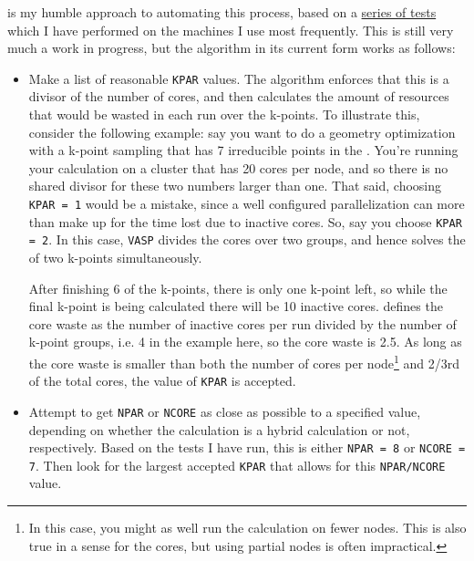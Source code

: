 \begin{refsection}
 is my humble approach to automating this 
process, based on a 
\href{https://mybinder.org/v2/gh/mbercx/jupyter/master?filepath=parallel\%2Fparallel_analysis.ipynb}{series 
of tests} which I have performed on the machines I use most frequently. This 
is still very much a work in progress, but the algorithm in its current form 
works as follows: 
 
\begin{itemize} 
 
\item Make a list of reasonable \texttt{KPAR} values. The algorithm enforces 
that this is a divisor of the number of cores, and then calculates the amount 
of resources that would be wasted in each run over the k-points. To illustrate 
this, consider the following example: say you want to do a geometry 
optimization with a k-point sampling that has 7 irreducible points in the 
. You're running your calculation on a cluster that 
has 20 cores per node, and so there is no shared divisor for these two 
numbers larger than one. That said, choosing \texttt{KPAR = 1} would be a mistake, since a 
well configured parallelization can more than make up for the time lost due to inactive 
cores. So, say you choose \texttt{KPAR = 2}. In this case, \texttt{VASP} 
divides the cores over two groups, and hence solves the  of two k-points simultaneously. 

After finishing 6 of the k-points, there is only one k-point left, so while 
the final k-point is being calculated there will be 10 inactive cores. 
 defines the core waste as the number of 
inactive cores per run divided by the number of k-point groups, i.e. 4 in the 
example here, so the core waste is 2.5. As long as the core waste is smaller 
than both the number of cores per node\footnote{In this case, you might as 
well run the calculation on fewer nodes. This is also true in a sense for the 
cores, but using partial nodes is often impractical.} and 2/3rd of the total 
cores, the value of \texttt{KPAR} is accepted. 
 
\item Attempt to get \texttt{NPAR} or \texttt{NCORE} as close as possible to a 
specified value, depending on whether the calculation is a hybrid calculation 
or not, respectively. Based on the tests I have run, this is either 
\texttt{NPAR = 8} or \texttt{NCORE = 7}. Then look for the largest accepted 
\texttt{KPAR} that allows for this \texttt{NPAR/NCORE} value. 
 

\end{itemize}
\end{refsection}
